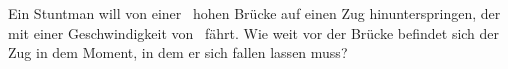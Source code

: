 Ein Stuntman will von einer \hbrO\ hohen Brücke auf einen Zug hinunterspringen, der mit einer Geschwindigkeit von \vzO\ fährt. Wie weit vor der Brücke befindet sich der Zug in dem Moment, in dem er sich fallen lassen muss?
